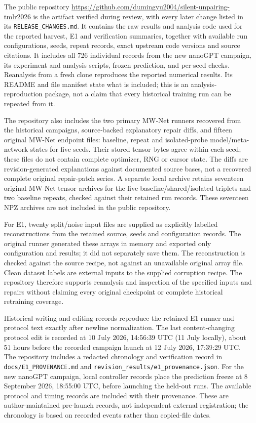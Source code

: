\documentclass[10pt,letterpaper]{article}
\theoremstyle{remark}
\newcommand{\code}[1]{\texttt{#1}}
\begin{document}
The public repository
\url{https://github.com/dumingyu2004/silent-unpairing-tmlr2026} is the artifact
verified during review, with every later change listed in its
\code{RELEASE\_CHANGES.md}. It contains the raw results and analysis code
used for the reported harvest, E1 and verification summaries, together with
available run configurations, seeds, repeat records, exact upstream code
versions and source citations. It includes all 726 individual records from
the new nanoGPT campaign, its experiment and analysis scripts, frozen
prediction, and per-seed checks. Reanalysis from a fresh clone
reproduces the reported numerical results. Its README and file manifest
state what is included; this is an analysis-reproduction package, not a
claim that every historical training run can be repeated from it.

The repository also includes the two primary MW-Net runners recovered from
the historical campaigns, source-backed explanatory repair diffs, and fifteen original
MW-Net endpoint files: baseline, repeat and isolated-probe model/meta-network
states for five seeds. Their stored tensor bytes agree within each seed;
these files do not contain complete optimizer, RNG or cursor state.
The diffs are revision-generated explanations against documented source
bases, not a recovered complete original repair-patch series.
A separate local archive retains seventeen original MW-Net tensor
archives for the five baseline/shared/isolated triplets and two baseline
repeats, checked against their retained run records. These seventeen NPZ
archives are not included in the public repository.

For E1, twenty split/noise input files are supplied as explicitly labelled
reconstructions from the retained source, seeds and configuration records.
The original runner generated these arrays in memory and exported only
configuration and results; it did not separately save them. The reconstruction
is checked against the source recipe, not against an unavailable original
array file. Clean dataset labels are external inputs to the supplied corruption
recipe. The repository therefore supports reanalysis and inspection of the
specified inputs and repairs without claiming every original checkpoint or
complete historical retraining coverage.

Historical writing and editing records reproduce the retained E1 runner and
protocol text exactly after newline normalization. The last content-changing
protocol edit is recorded at 10 July 2026, 14:56:39 UTC (11 July locally),
about 51 hours before the recorded campaign launch at 12 July 2026,
17:39:29 UTC. The repository includes a redacted chronology and verification
record in \code{docs/E1\_PROVENANCE.md} and
\code{revision\_results/e1\_provenance.json}.
For the new nanoGPT campaign, local controller records place the prediction
freeze at 8 September 2026, 18:55:00 UTC, before launching the held-out runs.
The available protocol and timing records are included with their provenance.
These are author-maintained pre-launch records, not independent external
registration; the chronology is based on recorded events rather than
copied-file dates.
\end{document}
